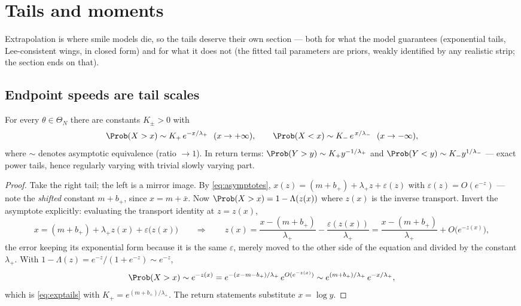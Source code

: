 \section{Tails and moments}
\label{sec:tails}

Extrapolation is where smile models die, so the tails deserve their own
section --- both for what the model guarantees (exponential tails,
Lee-consistent wings, in closed form) and for what it does not (the fitted
tail parameters are priors, weakly identified by any realistic strip; the
section ends on that).

\subsection{Endpoint speeds are tail scales}

\begin{proposition}
\label{prop:tails}
For every $\theta\in\Theta_N$ there are constants $K_\pm>0$ with
\begin{equation}
\Prob(X>x)\sim K_+\,e^{-x/\lambda_+}\ \ (x\to+\infty),
\qquad
\Prob(X<x)\sim K_-\,e^{\,x/\lambda_-}\ \ (x\to-\infty),
\label{eq:exptails}
\end{equation}
where $\sim$ denotes asymptotic equivalence (ratio $\to1$).  In return
terms: $\Prob(Y>y)\sim K_+y^{-1/\lambda_+}$ and
$\Prob(Y<y)\sim K_-y^{1/\lambda_-}$ --- exact power tails, hence regularly
varying with trivial slowly varying part.
\end{proposition}

\begin{proof}
Take the right tail; the left is a mirror image.  By
\eqref{eq:asymptotes}, $x(z)=(m+b_{+})+\lambda_+z+\varepsilon(z)$ with
$\varepsilon(z)=O(e^{-z})$ --- note the \emph{shifted} constant
$m+b_{+}$, since $x=m+\bar{x}$.  Now $\Prob(X>x)=1-\Lambda(z(x))$ where
$z(x)$ is the inverse transport.  Invert the asymptote explicitly:
evaluating the transport identity at $z=z(x)$,
\[
x=(m+b_{+})+\lambda_+z(x)+\varepsilon\big(z(x)\big)
\qquad\Longrightarrow\qquad
z(x)=\frac{x-(m+b_{+})}{\lambda_+}-\frac{\varepsilon(z(x))}{\lambda_+}
=\frac{x-(m+b_{+})}{\lambda_+}+O\big(e^{-z(x)}\big),
\]
the error keeping its exponential form because it is the same
$\varepsilon$, merely moved to the other side of the equation and
divided by the constant $\lambda_+$.  With
$1-\Lambda(z)=e^{-z}/(1+e^{-z})\sim e^{-z}$,
\[
\Prob(X>x)\sim e^{-z(x)}
= e^{-(x-m-b_{+})/\lambda_+}\,e^{O(e^{-z(x)})}
\sim e^{(m+b_{+})/\lambda_+}\,e^{-x/\lambda_+},
\]
which is \eqref{eq:exptails} with $K_+=e^{(m+b_{+})/\lambda_+}$.  The
return statements substitute $x=\log y$.
\end{proof}

